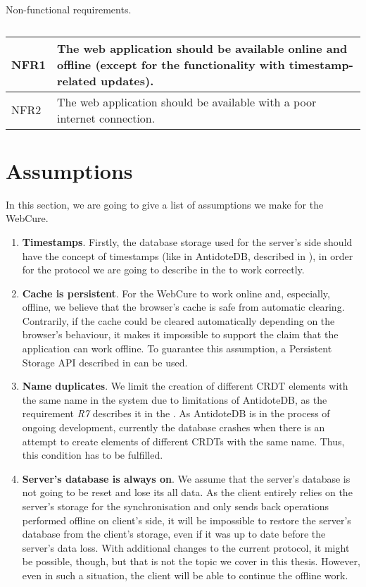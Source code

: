 \begin{table}[!htbp]
\centering
\caption{Non-functional requirements.}
\label{table:req2}
\begin{tabular}{|p{1cm}|p{14cm}|}
\hline
NFR1 & The web application should be available online and offline (except for the functionality with timestamp-related updates). \\ \hline
NFR2 & The web application should be available with a poor internet connection. \\ \hline
\end{tabular}
\caption*{}
\end{table}

\section{Assumptions}

In this section, we are going to give a list of assumptions we make for the WebCure. 

\begin{enumerate}
\item {\textbf{Timestamps}. Firstly, the database storage used for the server's side should have the concept of timestamps (like in AntidoteDB, described in ), in order for the protocol we are going to describe in the  to work correctly.}
\item {\textbf{Cache is persistent}. For the WebCure to work online and, especially, offline, we believe that the browser's cache is safe from automatic clearing. Contrarily, if the cache could be cleared automatically depending on the browser's behaviour, it makes it impossible to support the claim that the application can work offline. To guarantee this assumption, a Persistent Storage API described in  can be used.}
\item{\textbf{Name duplicates}. We limit the creation of different CRDT elements with the same name in the system due to limitations of AntidoteDB, as the requirement \textit{R7} describes it in the . As AntidoteDB is in the process of ongoing development, currently the database crashes when there is an attempt to create elements of different CRDTs with the same name. Thus, this condition has to be fulfilled.}
\item{\textbf{Server's database is always on}. We assume that the server's database is not going to be reset and lose its all data. As the client entirely relies on the server's storage for the synchronisation and only sends back operations performed offline on client's side, it will be impossible to restore the server's database from the client's storage, even if it was up to date before the server's data loss. With additional changes to the current protocol, it might be possible, though, but that is not the topic we cover in this thesis. However, even in such a situation, the client will be able to continue the offline work.}
\end{enumerate}

